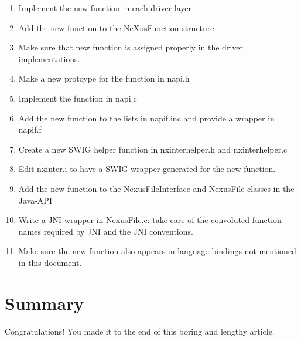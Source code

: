 \documentclass[a4paper]{article}
\begin{document}
\begin{enumerate}\item Implement the new function in each driver layer
\item Add the new function to the NeXusFunction structure
\item Make sure that new function is assigned properly in the driver implementations.
\item Make a new protoype for the function in napi.h
\item Implement the function in napi.c
\item Add the new function to the lists in napif.inc and provide a wrapper in napif.f
\item Create a new SWIG helper function in nxinterhelper.h and nxinterhelper.c
\item Edit nxinter.i to have a SWIG wrapper generated for the new function.
\item Add the new function to the NexusFileInterface and NexusFile classes in the Java-API
\item Write a JNI wrapper in NexusFile.c: take care of the convoluted function names required by JNI 
 and the JNI conventions.  
\item Make sure the new function also appears in language bindings not mentioned in this document.
\end{enumerate}\section{Summary }
Congratulations! You made it to the end of this boring and lengthy article.     


  
\end{document}

